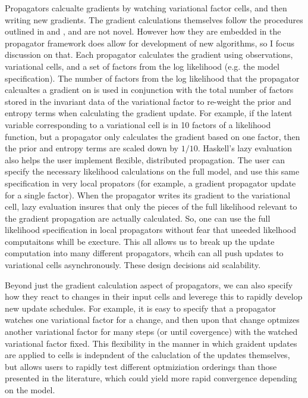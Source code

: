 \documentclass[12pt]{article}
\begin{document}
Propagators calcualte gradients by watching variational factor cells,
and then writing new gradients. The gradient calculations themselves
follow the procedures outlined in \citet{ranganath-2014} and
\citet{kuc-2017}, and are not novel. However how they are embedded in
the propagator framework does allow for development of new algorithms,
so I focus discussion on that. Each propagator calculates the gradient
using observations, variational cells, and a set of factors from the
log likelihood (e.g. the model specification). The number of factors
from the log likelihood that the propagator calcualtes a gradient on
is used in conjunction with the total number of factors stored in the
invariant data of the variational factor to re-weight the prior and
entropy terms when calculating the gradient update. For example, if
the latent variable corresponding to a variational cell is in 10
factors of a likelihood function, but a propagator only calculates the
gradient based on one factor, then the prior and entropy terms are
scaled down by $1/10$. Haskell's lazy evaluation also helps the user
implement flexible, distributed propagation. The user can specify the
necessary likelihood calculations on the full model, and use this same
specification in very local propators (for example, a gradient
propagator update for a single factor). When the propagator writes its
gradient to the variational cell, lazy evaluation insures that only
the pieces of the full likelihood relevant to the gradient propagation
are actually calculated. So, one can use the full likelihood
specification in local propagators without fear that uneeded likelhood
computaitons whill be execture. This all allows us to break up the
update computation into many different propagators, whcih can all push
updates to variational cells asynchronously. These design decisions
aid scalability.


Beyond just the gradient calculation aspect of propagators, we can
also specify how they react to changes in their input cells and
leverege this to rapidly develop new update schedules. For example, it
is easy to specify that a propagator watches one variational factor
for a change, and then upon that change optmizes another variational
factor for many steps (or until covergence) with the watched
variational factor fixed. This flexibility in the manner in which
graident updates are applied to cells is indepndent of the caluclation
of the updates themselves, but allows users to rapidly test different
optmiziation orderings than those presented in the literature, which
could yield more rapid convergence depending on the model.
\end{document}
